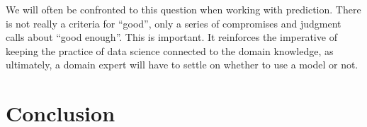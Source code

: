 \documentclass[
  letterpaper,
]{scrbook}
\begin{document}
We will often be confronted to this question when working with
prediction. There is not really a criteria for ``good'', only a series
of compromises and judgment calls about ``good enough''. This is
important. It reinforces the imperative of keeping the practice of data
science connected to the domain knowledge, as ultimately, a domain
expert will have to settle on whether to use a model or not.

{
\makeatletter
\def\LT@makecaption#1#2#3{%
  \noalign{\smash{\hbox{\kern\textwidth\rlap{\kern\marginparsep
  \parbox[t]{\marginparwidth}{%
    \footnotesize{%
      \vspace{(1.1\baselineskip)}
    #1{#2: }\ignorespaces #3}}}}}}%
    }
\makeatother

\begin{figure}[bt]



\end{figure}%

}

\section{Conclusion}\label{conclusion-2}
\end{document}
